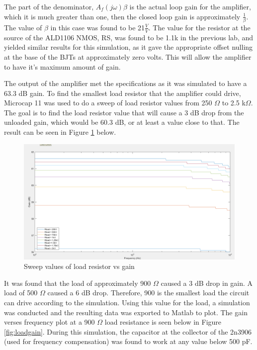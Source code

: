 The part of the denominator, $A_f(j\omega)\beta$ is the actual loop gain for the amplifier, which it is much greater than one, then the closed loop gain is approximately $\frac{1}{\beta}$. The value of $\beta$ in this case was found to be 21$\frac{V}{V} $. The value for the resistor at the source of the ALD1106 NMOS, RS, was found to be 1.1k in the previous lab, and yielded similar results for this simulation, as it gave the appropriate offset nulling at the base of the BJTs at approximately zero volts. This will allow the amplifier to have it's maximum amount of gain. 

The output of the amplifier met the specifications as it was simulated to have a 63.3 dB gain. To find the smallest load resistor that the amplifier could drive, Microcap 11 was used to do a sweep of load resistor values from 250 $\Omega$ to 2.5 k$\Omega$. The goal is to find the load resistor value that will cause a 3 dB drop from the unloaded gain, which would be 60.3 dB, or at least a value close to that. The result can be seen in Figure \ref{fig:loadsweep} below.

\begin{figure}[H]
	\centering
	\includegraphics[width=0.7\linewidth]{CircuitDevelopment/varyrload.png}
	\caption{Sweep values of load resistor vs gain}
	\label{fig:loadsweep}
\end{figure}


It was found that the load of approximately 900 $\Omega$ caused a 3 dB drop in gain. A load of 500 $\Omega$ caused a 6 dB drop. Therefore, 900 is the smallest load the circuit can drive according to the simulation. Using this value for the load, a simulation was conducted and the resulting data was exported to Matlab to plot. The gain verses frequency plot at a 900 $\Omega$ load resistance is seen below in Figure \ref{fig:loadgain}. During this simulation, the capacitor at the collector of the 2n3906 (used for frequency compensation) was found to work at any value below 500 pF. 

